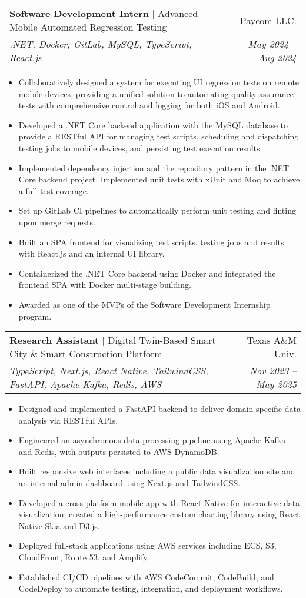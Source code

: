 \documentclass[letterpaper,11pt]{article}
\makeatletter
\newcommand{\mySecondaryItem}[1]{
  \item\raggedright\small{#1\vspace{-.5pt}}
}
\newcommand{\experienceSubHeading}[5]{
  \item[]
  \begin{tabular*}{\textwidth}{l@{\extracolsep{\fill}}r}
    \textbf{#1} | {#2} & {#3} \\
    \small{\textit{#4}} & \textit{\small{#5}} \\
  \end{tabular*}\vspace{-5pt}
}
\newcommand{\itemListStart}{\begin{itemize}[leftmargin=*]}
\newcommand{\itemListEnd}{\end{itemize}\vspace{-5pt}}
\makeatother
\begin{document}
\experienceSubHeading
{Software Development Intern}
{Advanced Mobile Automated Regression Testing}
{Paycom LLC.}
{.NET, Docker, GitLab, MySQL, TypeScript, React.js}
{May 2024 -- Aug 2024}
\itemListStart
\mySecondaryItem{
  Collaboratively designed a system for executing UI regression tests on remote mobile devices, providing a unified solution to automating quality assurance tests with comprehensive control and logging for both iOS and Android.
}
\mySecondaryItem{
  Developed a .NET Core backend application with the MySQL database to provide a RESTful API for managing test scripts, scheduling and dispatching testing jobs to mobile devices, and persisting test execution results.
}
\mySecondaryItem{
  Implemented dependency injection and the repository pattern in the .NET Core backend project. Implemented unit tests with xUnit and Moq to achieve a full test coverage.
}
\mySecondaryItem{
  Set up GitLab CI pipelines to automatically perform unit testing and linting upon merge requests.
}
\mySecondaryItem{
  Built an SPA frontend for visualizing test scripts, testing jobs and results with React.js and an internal UI library.
}
\mySecondaryItem{
  Containerized the .NET Core backend using Docker and integrated the frontend SPA with Docker multi-stage building.
}
\mySecondaryItem{
  Awarded as one of the MVPs of the Software Development Internship program.
}
\itemListEnd

\experienceSubHeading
{Research Assistant}
{Digital Twin-Based Smart City \& Smart Construction Platform
}
{Texas A\&M Univ.}
{TypeScript, Next.js, React Native, TailwindCSS, FastAPI, Apache Kafka, Redis, AWS}
{Nov 2023 -- May 2025}
\itemListStart
\mySecondaryItem{
  Designed and implemented a FastAPI backend to deliver domain-specific data analysis via RESTful APIs.
}
\mySecondaryItem{
  Engineered an asynchronous data processing pipeline using Apache Kafka and Redis, with outputs persisted to AWS DynamoDB.
}
\mySecondaryItem{
  Built responsive web interfaces including a public data visualization site and an internal admin dashboard using Next.js and TailwindCSS.
}
\mySecondaryItem{
  Developed a cross-platform mobile app with React Native for interactive data visualization; created a high-performance custom charting library using React Native Skia and D3.js.
}
\mySecondaryItem{
  Deployed full-stack applications using AWS services including ECS, S3, CloudFront, Route 53, and Amplify.
}
\mySecondaryItem{
  Established CI/CD pipelines with AWS CodeCommit, CodeBuild, and CodeDeploy to automate testing, integration, and deployment workflows.
}
\itemListEnd
\end{document}
